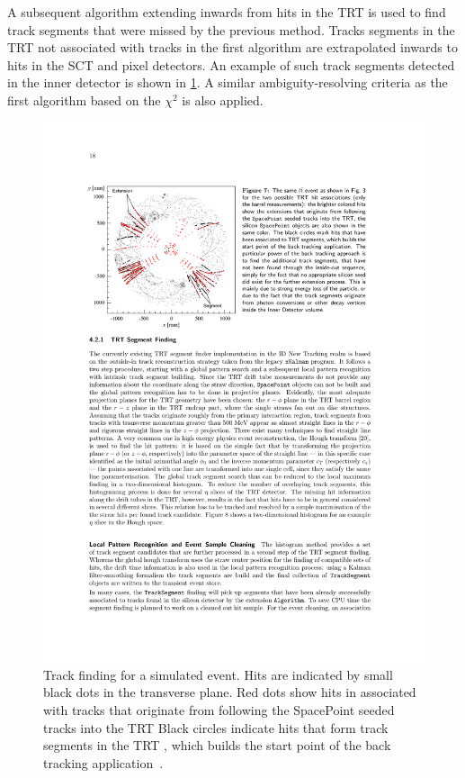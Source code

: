 A subsequent algorithm extending inwards from hits in the TRT is used to find track segments that were missed by the previous method. Tracks segments in the TRT not associated with tracks in the first algorithm are extrapolated inwards to hits in the SCT and pixel detectors. An example of such track segments detected in the inner detector is shown in \cref{fig:method:tracking-outside-in}. A similar ambiguity-resolving criteria as the first algorithm based on the $\chi^2$ is also applied. 
\begin{figure}[]
    \centering
    \includegraphics[width=\mediumfigwidth]{images/tracking-outside-in.pdf}
    \caption[Track finding for a simulated \ttbar event]{Track finding for a simulated \ttbar event.
    Hits are indicated by small black dots in the transverse plane.
    Red dots show hits in associated with tracks that originate from following the SpacePoint seeded tracks into the TRT
    Black circles indicate hits that form track segments in the TRT , which builds the start point of the back tracking application~\cite{ATLAS:tracking}.}
    \label{fig:method:tracking-outside-in}
\end{figure}

